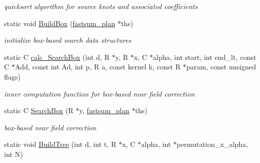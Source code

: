 \begin{DoxyCompactItemize}
\begin{DoxyCompactList}\small\item\em quicksort algorithm for source knots and associated coefficients \end{DoxyCompactList}\item 
\hypertarget{group__applications__fastsum_ga8237ee0c81a2518c4849e71317a479d0}{static void \hyperlink{group__applications__fastsum_ga8237ee0c81a2518c4849e71317a479d0}{Build\-Box} (\hyperlink{group__applications__fastsum_gad953252f6b309404991c4afc7b98b34b}{fastsum\-\_\-plan} $\ast$ths)}\label{group__applications__fastsum_ga8237ee0c81a2518c4849e71317a479d0}

\begin{DoxyCompactList}\small\item\em initialize box-\/based search data structures \end{DoxyCompactList}\item 
\hypertarget{group__applications__fastsum_gad2a29e7922167e36332e65f1fe850a99}{static C \hyperlink{group__applications__fastsum_gad2a29e7922167e36332e65f1fe850a99}{calc\-\_\-\-Search\-Box} (int d, R $\ast$y, R $\ast$x, C $\ast$alpha, int start, int end\-\_\-lt, const C $\ast$Add, const int Ad, int p, R a, const kernel k, const R $\ast$param, const unsigned flags)}\label{group__applications__fastsum_gad2a29e7922167e36332e65f1fe850a99}

\begin{DoxyCompactList}\small\item\em inner computation function for box-\/based near field correction \end{DoxyCompactList}\item 
\hypertarget{group__applications__fastsum_ga98e8ca1953cfc58ae708f59436ff81ca}{static C \hyperlink{group__applications__fastsum_ga98e8ca1953cfc58ae708f59436ff81ca}{Search\-Box} (R $\ast$y, \hyperlink{group__applications__fastsum_gad953252f6b309404991c4afc7b98b34b}{fastsum\-\_\-plan} $\ast$ths)}\label{group__applications__fastsum_ga98e8ca1953cfc58ae708f59436ff81ca}

\begin{DoxyCompactList}\small\item\em box-\/based near field correction \end{DoxyCompactList}\item 
\hypertarget{group__applications__fastsum_ga1b76192eed4445c9f2bea1a91c211cc4}{static void \hyperlink{group__applications__fastsum_ga1b76192eed4445c9f2bea1a91c211cc4}{Build\-Tree} (int d, int t, R $\ast$x, C $\ast$alpha, int $\ast$permutation\-\_\-x\-\_\-alpha, int N)}\label{group__applications__fastsum_ga1b76192eed4445c9f2bea1a91c211cc4}


\end{DoxyCompactItemize}
